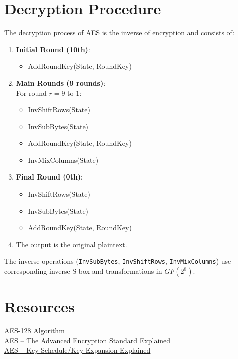 \documentclass[12pt,a4paper]{report}
\begin{document}
\section{Decryption Procedure}
The decryption process of AES is the inverse of encryption and consists of:
\begin{enumerate}
\item \textbf{Initial Round (10th)}:
\begin{itemize}
\item AddRoundKey(State, RoundKey)
\end{itemize}

\item \textbf{Main Rounds (9 rounds)}:\\
For round $r = 9$ to $1$:
\begin{itemize}
    \item InvShiftRows(State)
    \item InvSubBytes(State)
    \item AddRoundKey(State, RoundKey)
    \item InvMixColumns(State)
\end{itemize}

\item \textbf{Final Round (0th)}:
\begin{itemize}
    \item InvShiftRows(State)
    \item InvSubBytes(State)
    \item AddRoundKey(State, RoundKey)
\end{itemize}

\item The output is the original plaintext.
\end{enumerate}

The inverse operations (\texttt{InvSubBytes}, \texttt{InvShiftRows}, \texttt{InvMixColumns}) use corresponding inverse S-box and transformations in $GF(2^8)$.

\section{Resources}
\href{https://colab.research.google.com/drive/1xG7OrAtUqqsfvo9QRrrAGK-PmNgoB5Zf#scrollTo=ioJzVTF3HBwT}{AES-128 Algorithm}\\
\href{https://youtu.be/h6wvqm0aXco?si=lmESeaAiUIHnJjqN}{AES – The Advanced Encryption Standard Explained}\\
\href{https://youtu.be/rmqWaktEpcw?si=qunMHYUmwdtMGwfW}{AES – Key Schedule/Key Expansion Explained}
\end{document}
